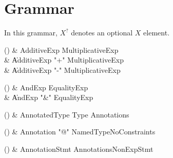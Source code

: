 
\chapter{Grammar}\label{Grammar}


In this grammar, $X^?$ denotes an optional $X$ element.


\begin{bbgrammarappendix}{3.9in}

() & AdditiveExp \label{prod:AdditiveExp}  \: MultiplicativeExp  \\

 &    \| AdditiveExp \xcd"+" MultiplicativeExp \\
 &    \| AdditiveExp \xcd"-" MultiplicativeExp \\

\end{bbgrammarappendix}

\begin{bbgrammarappendix}{4.4in}

() & AndExp \label{prod:AndExp}  \: EqualityExp  \\

 &    \| AndExp \xcd"&" EqualityExp \\

\end{bbgrammarappendix}

\begin{bbgrammarappendix}{3.7in}

() & AnnotatedType \label{prod:AnnotatedType}  \: Type Annotations  \\


\end{bbgrammarappendix}

\begin{bbgrammarappendix}{4.0in}

() & Annotation \label{prod:Annotation}  \: \xcd"@" NamedTypeNoConstraints  \\


\end{bbgrammarappendix}

\begin{bbgrammarappendix}{3.6in}

() & AnnotationStmt \label{prod:AnnotationStmt}  \: Annotations\opt NonExpStmt  \\


\end{bbgrammarappendix}

